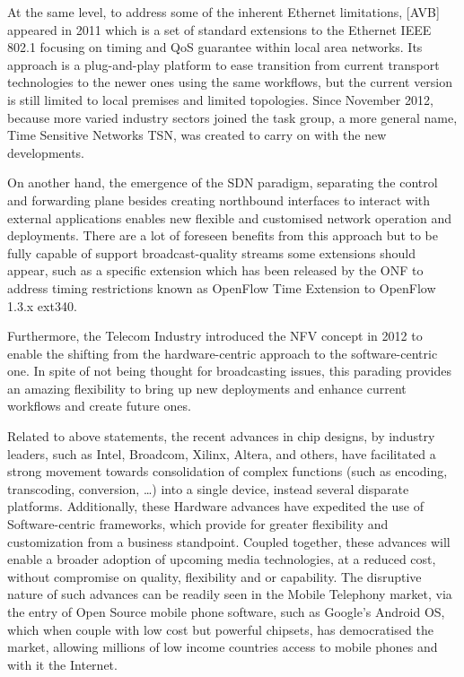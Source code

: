 At the same level, to address some of the inherent Ethernet limitations, [AVB] appeared in 2011
which is a set of standard extensions to the Ethernet IEEE 802.1 focusing on timing and QoS
guarantee within local area networks. Its approach is a plug-and-play platform to ease transition from
current transport technologies to the newer ones using the same workflows, but the current version is
still limited to local premises and limited topologies. Since November 2012, because more varied
industry sectors joined the task group, a more general name, Time Sensitive Networks TSN, was
created to carry on with the new developments.

On another hand, the emergence of the SDN paradigm, separating the control and forwarding plane
besides creating northbound interfaces to interact with external applications enables new flexible and
customised network operation and deployments. There are a lot of foreseen benefits from this
approach but to be fully capable of support broadcast-quality streams some extensions should appear,
such as a specific extension which has been released by the ONF to address timing restrictions known
as OpenFlow Time Extension to OpenFlow 1.3.x ext340.

Furthermore, the Telecom Industry introduced the NFV concept in 2012 to enable the shifting from
the hardware-centric approach to the software-centric one. In spite of not being thought for
broadcasting issues, this parading provides an amazing flexibility to bring up new deployments and
enhance current workflows and create future ones.

Related to above statements, the recent advances in chip designs, by industry leaders, such as Intel,
Broadcom, Xilinx, Altera, and others, have facilitated a strong movement towards consolidation of complex functions (such as encoding, transcoding, conversion, \ldots ) into a single device, instead
several disparate platforms. Additionally, these Hardware advances have expedited the use of
Software-centric frameworks, which provide for greater flexibility and customization from a business
standpoint. Coupled together, these advances will enable a broader adoption of upcoming media
technologies, at a reduced cost, without compromise on quality, flexibility and or capability. The
disruptive nature of such advances can be readily seen in the Mobile Telephony market, via the entry
of Open Source mobile phone software, such as Google’s Android OS, which when couple with low
cost but powerful chipsets, has democratised the market, allowing millions of low income countries
access to mobile phones and with it the Internet.

